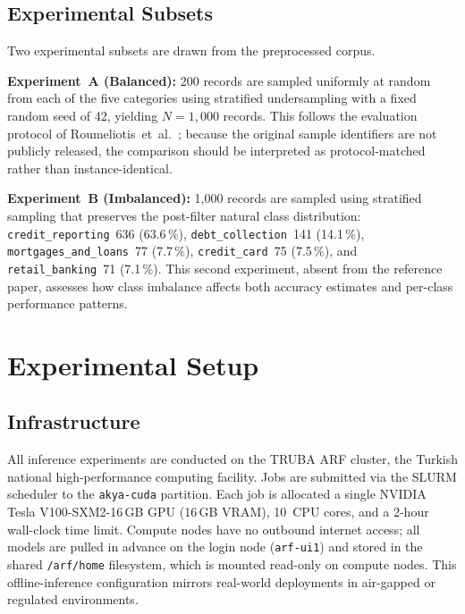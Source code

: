 \documentclass[journal]{IEEEtran}
\begin{document}
\subsection{Experimental Subsets}

Two experimental subsets are drawn from the preprocessed corpus.

\textbf{Experiment~A (Balanced):} 200 records are sampled uniformly
at random from each of the five categories using stratified
undersampling with a fixed random seed of 42, yielding
$N = 1{,}000$ records. This follows the evaluation protocol of
Roumeliotis~et~al.\ \cite{roumeliotis2025think}; because the original
sample identifiers are not publicly released, the comparison should be
interpreted as protocol-matched rather than instance-identical.

\textbf{Experiment~B (Imbalanced):} 1,000 records are sampled using
stratified sampling that preserves the post-filter natural class
distribution:
\texttt{credit\_reporting}~636 (63.6\,\%),
\texttt{debt\_collection}~141 (14.1\,\%),
\texttt{mortgages\_and\_loans}~77 (7.7\,\%),
\texttt{credit\_card}~75 (7.5\,\%), and
\texttt{retail\_banking}~71 (7.1\,\%).
This second experiment, absent from the reference paper, assesses
how class imbalance affects both accuracy estimates and per-class
performance patterns.


\section{Experimental Setup}
\label{sec:setup}

\subsection{Infrastructure}

All inference experiments are conducted on the TRUBA ARF cluster,
the Turkish national high-performance computing facility. Jobs are
submitted via the SLURM scheduler to the \texttt{akya-cuda} partition.
Each job is allocated a single NVIDIA Tesla V100-SXM2-16\,GB GPU
(16\,GB VRAM), 10~CPU cores, and a 2-hour wall-clock time limit.
Compute nodes have no outbound internet access; all models are pulled
in advance on the login node (\texttt{arf-ui1}) and stored in the
shared \texttt{/arf/home} filesystem, which is mounted read-only on
compute nodes. This offline-inference configuration mirrors real-world
deployments in air-gapped or regulated environments.
\end{document}
